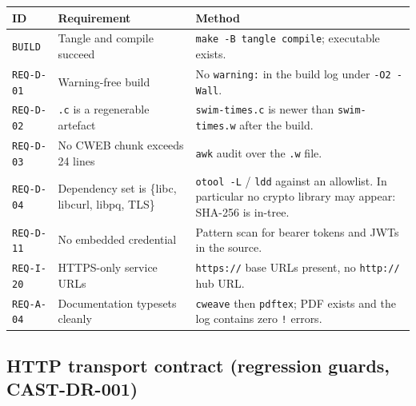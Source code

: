 \documentclass[12pt]{article}
\newcommand{\code}[1]{\texttt{#1}}
\newcommand{\req}[1]{\texttt{#1}}
\begin{document}
\begin{center}
\begin{longtable}{p{2.1cm}p{5.2cm}p{6.2cm}}
  \toprule
  \textbf{ID} & \textbf{Requirement} & \textbf{Method} \\
  \midrule\endhead
  \req{BUILD}     & Tangle and compile succeed
    & \code{make -B tangle compile}; executable exists. \\
  \req{REQ-D-01}  & Warning-free build
    & No \code{warning:} in the build log under \code{-O2 -Wall}. \\
  \req{REQ-D-02}  & \code{.c} is a regenerable artefact
    & \code{swim-times.c} is newer than \code{swim-times.w} after the
      build. \\
  \req{REQ-D-03}  & No CWEB chunk exceeds 24 lines
    & \code{awk} audit over the \code{.w} file. \\
  \req{REQ-D-04}  & Dependency set is \{libc, libcurl, libpq, TLS\}
    & \code{otool -L} / \code{ldd} against an allowlist.  In
      particular no crypto library may appear: SHA-256 is in-tree. \\
  \req{REQ-D-11}  & No embedded credential
    & Pattern scan for bearer tokens and JWTs in the source. \\
  \req{REQ-I-20}  & HTTPS-only service URLs
    & \code{https://} base URLs present, no \code{http://} hub URL. \\
  \req{REQ-A-04}  & Documentation typesets cleanly
    & \code{cweave} then \code{pdftex}; PDF exists and the log
      contains zero \code{!} errors. \\
  \bottomrule
\end{longtable}
\end{center}

\subsection{HTTP transport contract (regression guards, CAST-DR-001)}
\end{document}
